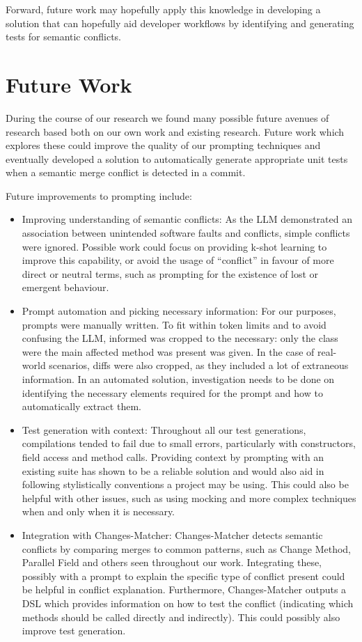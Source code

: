 Forward, future work may hopefully apply this knowledge in developing a solution that can hopefully aid developer workflows by identifying and generating tests for semantic conflicts.

\section{Future Work}

During the course of our research we found many possible future avenues of research based both on our own work and existing research. Future work which explores these could improve
the quality of our prompting techniques and eventually developed a solution to automatically generate appropriate unit tests when a semantic merge conflict is detected in a commit.

Future improvements to prompting include:

\begin{itemize}
\item Improving understanding of semantic conflicts: As the LLM demonstrated an association between unintended software faults and conflicts, simple conflicts were ignored.
Possible work could focus on providing k-shot learning to improve this capability, or avoid the usage of ``conflict'' in favour of more direct or neutral terms, such as prompting
for the existence of lost or emergent behaviour.

\item Prompt automation and picking necessary information: For our purposes, prompts were manually written. To fit within token limits and to avoid confusing the LLM, informed was cropped to
the necessary: only the class were the main affected method was present was given. In the case of real-world scenarios, diffs were also cropped, as they included a lot of extraneous information.
In an automated solution, investigation needs to be done on identifying the necessary elements required for the prompt and how to automatically extract them.

\item Test generation with context: Throughout all our test generations, compilations tended to fail due to small errors, particularly with constructors, field access and method calls.
Providing context by prompting with an existing suite has shown to be a reliable solution and would also aid in following stylistically conventions a project may be using.
This could also be helpful with other issues, such as using mocking and more complex techniques when and only when it is necessary.

\item Integration with Changes-Matcher: Changes-Matcher detects semantic conflicts by comparing merges to common patterns, such as Change Method, Parallel Field and others
seen throughout our work. Integrating these, possibly with a prompt to explain the specific type of conflict present could be helpful in conflict explanation.
Furthermore, Changes-Matcher outputs a DSL which provides information on how to test the conflict (indicating which methods should be called directly and indirectly). This could possibly
also improve test generation.
\end{itemize}

